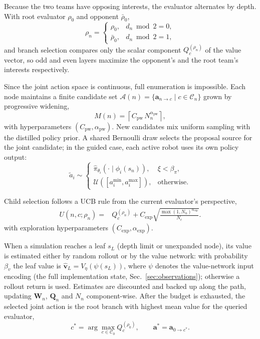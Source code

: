 \documentclass[letterpaper,10pt,conference]{ieeeconf}
\begin{document}
Because the two teams have opposing interests, the evaluator alternates
by depth. With root evaluator $\rho_0$ and opponent $\bar{\rho}_0$,
\begin{equation}
\rho_n=
\begin{cases}
\rho_0, & d_n \bmod 2 = 0,\\
\bar{\rho}_0, & d_n \bmod 2 = 1,
\end{cases}
\label{eq:alternating}
\end{equation}
and branch selection compares only the scalar component
$Q_c^{(\rho_n)}$ of the value vector, so odd and even layers maximize the
opponent's and the root team's interests respectively.

Since the joint action space is continuous, full enumeration is
impossible. Each node maintains a finite candidate set
$\mathcal{A}(n)=\{\mathbf{a}_{n\to c}\mid c\in\mathcal{C}_n\}$ grown by
progressive widening,
\begin{equation}
M(n)=\left\lceil C_{\mathrm{pw}}\,N_n^{\alpha_{\mathrm{pw}}}\right\rceil ,
\label{eq:pw}
\end{equation}
with hyperparameters $(C_{\mathrm{pw}},\alpha_{\mathrm{pw}})$. New
candidates mix uniform sampling with the distilled policy prior. A shared
Bernoulli draw selects the proposal source for the joint candidate; in
the guided case, each active robot uses its own policy output:
\begin{equation}
\tilde a_i\sim
\begin{cases}
\hat\pi_{\theta_i}(\cdot\mid \phi_i(s_n)),&
\xi<\beta_\pi,\\
\mathcal U([a_i^{\min},a_i^{\max}]),&\text{otherwise}.
\end{cases}
\label{eq:pw_guided}
\end{equation}

Child selection follows a UCB rule from the current evaluator's
perspective,
\begin{equation}
\begin{aligned}
U(n,c;\rho_n)
={}&Q_c^{(\rho_n)}
 +C_{\mathrm{exp}}
\sqrt{\frac{\max(1,N_n)^{\alpha_{\mathrm{exp}}}}{N_c}} .
\end{aligned}
\label{eq:ucb}
\end{equation}
with exploration hyperparameters $(C_{\mathrm{exp}},\alpha_{\mathrm{exp}})$.

When a simulation reaches a leaf $s_L$ (depth limit or unexpanded node),
its value is estimated either by random rollout or by the value network:
with probability $\beta_v$ the leaf value is
$\hat{\mathbf{v}}_L=V_\eta(\psi(s_L))$, where $\psi$ denotes the
value-network input encoding (the full implementation state,
Sec.~\ref{sec:observations});
otherwise a rollout return is used. Estimates are discounted and backed up along the path, updating
$\mathbf{W}_n$, $\mathbf{Q}_n$ and $N_n$ component-wise. After the budget
is exhausted, the selected joint action is the root branch with highest
mean value for the queried evaluator,
\begin{equation}
c^*=\arg\max_{c\in\mathcal{C}_0} Q_c^{(\rho_0)},
\qquad
\mathbf{a}^*=\mathbf{a}_{0\to c^*} .
\label{eq:root_action}
\end{equation}
\end{document}
